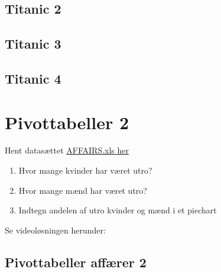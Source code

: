 \documentclass[
]{book}
\begin{document}
\begin{embed-container}

\end{embed-container}

\hypertarget{titanic-2}{%
\subsection{Titanic 2}\label{titanic-2}}

\begin{embed-container}

\end{embed-container}

\hypertarget{titanic-3}{%
\subsection{Titanic 3}\label{titanic-3}}

\begin{embed-container}

\end{embed-container}

\hypertarget{titanic-4}{%
\subsection{Titanic 4}\label{titanic-4}}

\begin{embed-container}

\end{embed-container}

\hypertarget{pivottabeller-2}{%
\section{Pivottabeller 2}\label{pivottabeller-2}}

Hent datasættet \href{./filer/AFFAIRS.xls}{AFFAIRS.xls her}

\begin{enumerate}
\def\labelenumi{\arabic{enumi}.}
\item
  Hvor mange kvinder har været utro?
\item
  Hvor mange mænd har været utro?
\item
  Indtegn andelen af utro kvinder og mænd i et piechart
\end{enumerate}

Se videoløsningen herunder:

\hypertarget{pivottabeller-affuxe6rer-2}{%
\subsection{Pivottabeller affærer 2}\label{pivottabeller-affuxe6rer-2}}
\end{document}
